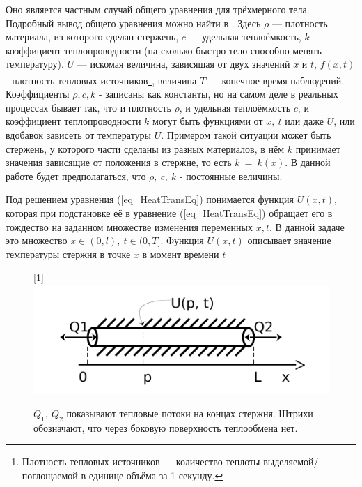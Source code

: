 \documentclass[oneside, final, 14pt]{report}
\begin{document}
Оно является частным случай общего уравнения для трёхмерного тела. Подробный вывод общего уравнения можно найти в \cite{bib:UMF_lectures}. Здесь $\rho $ --- плотность материала, из которого сделан стержень, $c$ --- удельная теплоёмкость, $k$ --- коэффициент теплопроводности (на сколько быстро тело способно менять температуру). $U$ --- искомая величина, зависящая от двух значений $x$ и $t$, $f(x, t)$ - плотность тепловых источников\footnote{Плотность тепловых источников --- количество теплоты выделяемой/поглощаемой в единице объёма за 1 секунду.}, величина $T$ --- конечное время наблюдений. Коэффициенты $\rho, c, k$ - записаны как константы, но на самом деле в реальных процессах бывает так, что и плотность $\rho$, и удельная теплоёмкость $c$, и коэффициент теплопроводности $k$ могут быть функциями от $x,\ t$ или даже $U$, или вдобавок зависеть от температуры $U$. Примером такой ситуации может быть стержень, у которого части сделаны из разных материалов, в нём $k$ принимает значения зависящие от положения в стержне, то есть $k \ = \ k(x)$. В данной работе будет предполагаться, что $\rho,\ c,\ k$ - постоянные величины.


Под решением уравнения (\ref{eq_HeatTransEq}) понимается функция $U(x, t)$, которая при подстановке её в уравнение (\ref{eq_HeatTransEq}) обращает его в тождество на заданном множестве изменения переменных $x, t$. В данной задаче это множество $x \in (0, l), \ t \in (0, T]$. Функция $U(x, t)$ описывает значение температуры стержня в точке $x$ в момент времени $t$

\begin{figure}[t!]
    \centering
    \scalebox{1.2}[1]{\includegraphics{../img_pdf_cropped/boundary_streams}}
    \caption{$Q_1, \ Q_2$ показывают тепловые потоки на концах стержня. Штрихи обозначают, что через боковую поверхность теплообмена нет.}
    \label{img_boarder_streams}
\end{figure}
\end{document}
